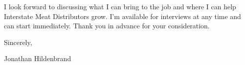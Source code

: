 \documentclass[letterpaper,12pt]{article}[leftmargin=*]
\begin{document}
\vspace{12pt}

\hspace{24pt}I look forward to discussing what I can bring to the job and where I can help Interstate Meat Distributors grow. I'm available for interviews at any time and can start immediately. Thank you in advance for your consideration.

\vspace{24pt}

Sincerely,

\vspace{12pt}

Jonathan Hildenbrand

\end{document}
